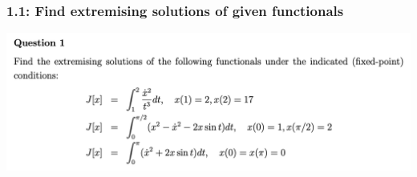 \subsubsection{1.1: Find extremising solutions of given functionals}
\begin{mdframed}
  \includegraphics[width=400pt]{img/cov-haliakis-ooc-1-1.png}
\end{mdframed}
